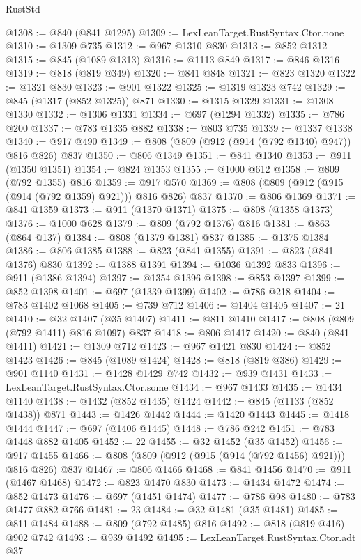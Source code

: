 \begin{lexlean}{RustStd}
\begin{coremodule}
@1308 := @840 (@841 @1295)
@1309 := LexLeanTarget.RustSyntax.Ctor.none
@1310 := @1309 @735
@1312 := @967 @1310 @830
@1313 := @852 @1312
@1315 := @845 (@1089 @1313)
@1316 := @1113 @849
@1317 := @846 @1316
@1319 := @818 (@819 @349)
@1320 := @841 @848
@1321 := @823 @1320
@1322 := @1321 @830
@1323 := @901 @1322
@1325 := @1319 @1323 @742
@1329 := @845 (@1317 (@852 @1325)) @871
@1330 := @1315 @1329
@1331 := @1308 @1330
@1332 := @1306 @1331
@1334 := @697 (@1294 @1332)
@1335 := @786 @200
@1337 := @783 @1335 @882
@1338 := @803 @735
@1339 := @1337 @1338
@1340 := @917 @490
@1349 := @808 (@809 (@912 (@914 (@792 @1340) @947)) @816 @826) @837
@1350 := @806 @1349
@1351 := @841 @1340
@1353 := @911 (@1350 @1351)
@1354 := @824 @1353
@1355 := @1000 @612
@1358 := @809 (@792 @1355) @816
@1359 := @917 @570
@1369 := @808 (@809 (@912 (@915 (@914 (@792 @1359) @921))) @816 @826) @837
@1370 := @806 @1369
@1371 := @841 @1359
@1373 := @911 (@1370 @1371)
@1375 := @808 (@1358 @1373)
@1376 := @1000 @628
@1379 := @809 (@792 @1376) @816
@1381 := @863 (@864 @137)
@1384 := @808 (@1379 @1381) @837
@1385 := @1375 @1384
@1386 := @806 @1385
@1388 := @823 (@841 @1355)
@1391 := @823 (@841 @1376) @830
@1392 := @1388 @1391
@1394 := @1036 @1392 @833
@1396 := @911 (@1386 @1394)
@1397 := @1354 @1396
@1398 := @853 @1397
@1399 := @852 @1398
@1401 := @697 (@1339 @1399)
@1402 := @786 @218
@1404 := @783 @1402 @1068
@1405 := @739 @712
@1406 := @1404 @1405
@1407 := 21
@1410 := @32 @1407 (@35 @1407)
@1411 := @811 @1410
@1417 := @808 (@809 (@792 @1411) @816 @1097) @837
@1418 := @806 @1417
@1420 := @840 (@841 @1411)
@1421 := @1309 @712
@1423 := @967 @1421 @830
@1424 := @852 @1423
@1426 := @845 (@1089 @1424)
@1428 := @818 (@819 @386)
@1429 := @901 @1140
@1431 := @1428 @1429 @742
@1432 := @939 @1431
@1433 := LexLeanTarget.RustSyntax.Ctor.some
@1434 := @967 @1433
@1435 := @1434 @1140
@1438 := @1432 (@852 @1435) @1424
@1442 := @845 (@1133 (@852 @1438)) @871
@1443 := @1426 @1442
@1444 := @1420 @1443
@1445 := @1418 @1444
@1447 := @697 (@1406 @1445)
@1448 := @786 @242
@1451 := @783 @1448 @882 @1405
@1452 := 22
@1455 := @32 @1452 (@35 @1452)
@1456 := @917 @1455
@1466 := @808 (@809 (@912 (@915 (@914 (@792 @1456) @921))) @816 @826) @837
@1467 := @806 @1466
@1468 := @841 @1456
@1470 := @911 (@1467 @1468)
@1472 := @823 @1470 @830
@1473 := @1434 @1472
@1474 := @852 @1473
@1476 := @697 (@1451 @1474)
@1477 := @786 @98
@1480 := @783 @1477 @882 @766
@1481 := 23
@1484 := @32 @1481 (@35 @1481)
@1485 := @811 @1484
@1488 := @809 (@792 @1485) @816
@1492 := @818 (@819 @416) @902 @742
@1493 := @939 @1492
@1495 := LexLeanTarget.RustSyntax.Ctor.adt @37

\end{coremodule}
\end{lexlean}
